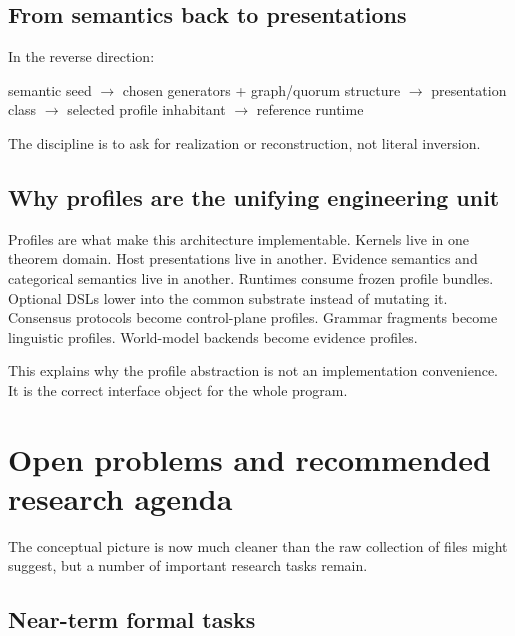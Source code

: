 \documentclass[11pt]{article}
\begin{document}
\subsection{From semantics back to presentations}

In the reverse direction:

\begin{center}
semantic seed
$\longrightarrow$
chosen generators + graph/quorum structure
$\longrightarrow$
presentation class
$\longrightarrow$
selected profile inhabitant
$\longrightarrow$
reference runtime
\end{center}

The discipline is to ask for realization or reconstruction, not literal inversion.

\subsection{Why profiles are the unifying engineering unit}

Profiles are what make this architecture implementable. Kernels live in one theorem domain. Host presentations live in another. Evidence semantics and categorical semantics live in another. Runtimes consume frozen profile bundles. Optional DSLs lower into the common substrate instead of mutating it. Consensus protocols become control-plane profiles. Grammar fragments become linguistic profiles. World-model backends become evidence profiles.

This explains why the profile abstraction is not an implementation convenience. It is the correct interface object for the whole program.

\section{Open problems and recommended research agenda}

The conceptual picture is now much cleaner than the raw collection of files might suggest, but a number of important research tasks remain.

\subsection{Near-term formal tasks}
\end{document}
